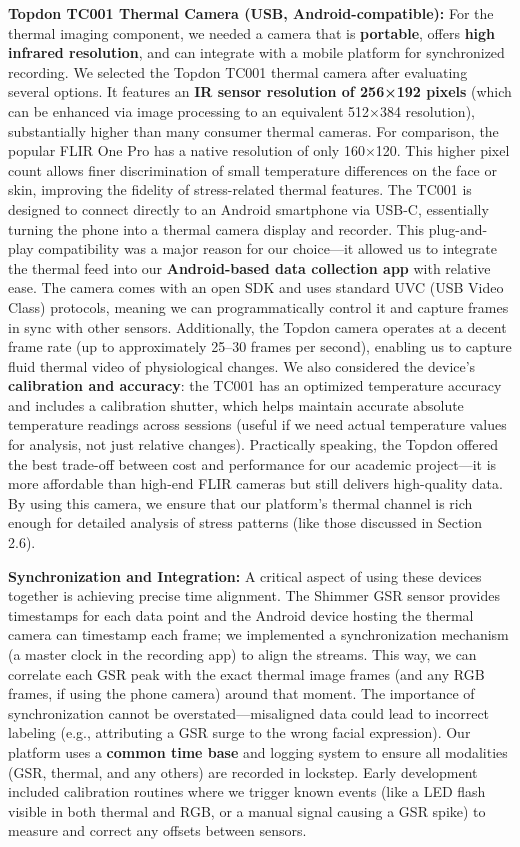 \documentclass[11pt,a4paper]{report}
\begin{document}
\textbf{Topdon TC001 Thermal Camera (USB, Android-compatible):} For the thermal imaging component, we needed a camera that is \textbf{portable}, offers \textbf{high infrared resolution}, and can integrate with a mobile platform for synchronized recording. We selected the Topdon TC001 thermal camera after evaluating several options. It features an \textbf{IR sensor resolution of 256×192 pixels} (which can be enhanced via image processing to an equivalent 512×384 resolution)\cite{TopdonTC001}, substantially higher than many consumer thermal cameras. For comparison, the popular FLIR One Pro has a native resolution of only 160×120. This higher pixel count allows finer discrimination of small temperature differences on the face or skin, improving the fidelity of stress-related thermal features. The TC001 is designed to connect directly to an Android smartphone via USB-C, essentially turning the phone into a thermal camera display and recorder. This plug-and-play compatibility was a major reason for our choice—it allowed us to integrate the thermal feed into our \textbf{Android-based data collection app} with relative ease. The camera comes with an open SDK and uses standard UVC (USB Video Class) protocols, meaning we can programmatically control it and capture frames in sync with other sensors. Additionally, the Topdon camera operates at a decent frame rate (up to approximately 25–30 frames per second), enabling us to capture fluid thermal video of physiological changes. We also considered the device's \textbf{calibration and accuracy}: the TC001 has an optimized temperature accuracy and includes a calibration shutter, which helps maintain accurate absolute temperature readings across sessions (useful if we need actual temperature values for analysis, not just relative changes). Practically speaking, the Topdon offered the best trade-off between cost and performance for our academic project—it is more affordable than high-end FLIR cameras but still delivers high-quality data. By using this camera, we ensure that our platform's thermal channel is rich enough for detailed analysis of stress patterns (like those discussed in Section 2.6).

\textbf{Synchronization and Integration:} A critical aspect of using these devices together is achieving precise time alignment. The Shimmer GSR sensor provides timestamps for each data point and the Android device hosting the thermal camera can timestamp each frame; we implemented a synchronization mechanism (a master clock in the recording app) to align the streams. This way, we can correlate each GSR peak with the exact thermal image frames (and any RGB frames, if using the phone camera) around that moment. The importance of synchronization cannot be overstated—misaligned data could lead to incorrect labeling (e.g., attributing a GSR surge to the wrong facial expression). Our platform uses a \textbf{common time base} and logging system to ensure all modalities (GSR, thermal, and any others) are recorded in lockstep. Early development included calibration routines where we trigger known events (like a LED flash visible in both thermal and RGB, or a manual signal causing a GSR spike) to measure and correct any offsets between sensors.
\end{document}
